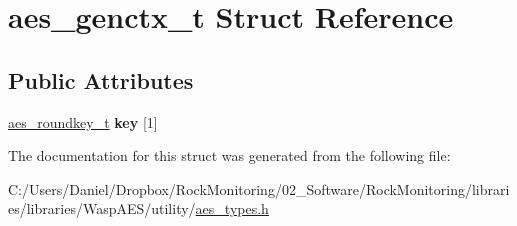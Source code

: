 \hypertarget{structaes__genctx__t}{}\section{aes\+\_\+genctx\+\_\+t Struct Reference}
\label{structaes__genctx__t}
\subsection*{Public Attributes}
\begin{DoxyCompactItemize}
\item 
\hyperlink{structaes__roundkey__t}{aes\+\_\+roundkey\+\_\+t} {\bfseries key} \mbox{[}1\mbox{]}\hypertarget{structaes__genctx__t_ad6f2d9e04f8e160714f893b577ead5a7}{}\label{structaes__genctx__t_ad6f2d9e04f8e160714f893b577ead5a7}

\end{DoxyCompactItemize}


The documentation for this struct was generated from the following file\+:\begin{DoxyCompactItemize}
\item 
C\+:/\+Users/\+Daniel/\+Dropbox/\+Rock\+Monitoring/02\+\_\+\+Software/\+Rock\+Monitoring/libraries/libraries/\+Wasp\+A\+E\+S/utility/\hyperlink{aes__types_8h}{aes\+\_\+types.\+h}\end{DoxyCompactItemize}
